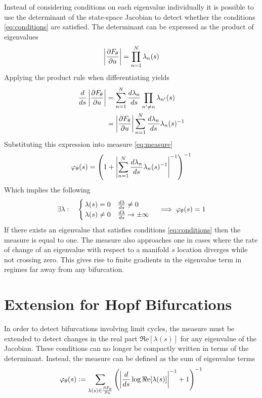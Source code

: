 Instead of considering conditions on each eigenvalue individually it is possible to use the determinant of the state-space Jacobian to detect whether the conditions \eqref{eq:conditions} are satisfied. The determinant can be expressed as the product of eigenvalues
\begin{equation}
    \left| \frac{\partial F_{\theta}}{\partial u} \right|=\prod_{n=1}^N\lambda_n(s)
    \label{eq:determinant}
\end{equation}
Applying the product rule when differentiating yields
\begin{align}
    \frac{d}{ds}\left| \frac{\partial F_{\theta}}{\partial u} \right|&=
    \sum_{n=1}^N\frac{d\lambda_n}{ds}\prod_{n'\neq n}\lambda_{n'}(s)\\
    &=\left| \frac{\partial F_{\theta}}{\partial u} \right|\sum_{n=1}^N\frac{d\lambda_n}{ds}\lambda_{n}(s)^{-1}
\end{align}
Substituting this expression into measure \eqref{eq:measure}
\begin{equation}
    \varphi_{\theta}(s)=
    \left(1+\left|\sum_{n=1}^N\frac{d\lambda_n}{ds}\lambda_{n}(s)^{-1}\right|^{-1}\right)^{-1}
\end{equation}
Which implies the following
\begin{equation}
    \exists\lambda:\quad
    \begin{cases}
        \,\lambda(s)=0 \quad\frac{d\lambda}{ds}\neq 0\\
        \,\lambda(s)\neq0 \quad\frac{d\lambda}{ds}\rightarrow\pm\infty
    \end{cases}
    \implies
    \varphi_{\theta}(s)=1
\end{equation}
If there exists an eigenvalue that satisfies conditions \eqref{eq:conditions} then the measure is equal to one. The measure also approaches one in cases where the rate of change of an eigenvalue with respect to a manifold $s$ location  diverges while not crossing zero. This gives rise to finite gradients in the eigenvalue term in regimes far away from any bifurcation.

\section{Extension for Hopf Bifurcations}
\label{appendix:hopf}

In order to detect bifurcations involving limit cycles, the measure must be extended to detect changes in the real part $\Re\mathrm{e}[\lambda(s)]$ for any eigenvalue of the Jacobian. These conditions can no longer be compactly written in terms of the determinant. Instead, the measure can be defined as the sum of eigenvalue terms 
\begin{align}
    \varphi_{\theta}(s):=\sum_{\lambda(s)\in\frac{\partial F_{\theta}}{\partial u}}
    \left(\left|\frac{d}{ds}\log\Re\mathrm{e}[\lambda(s)]\right|^{-1}+1\right)^{-1}
    \label{eq:hopf-measure}
\end{align}

